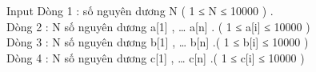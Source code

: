 Input
Dòng 1 : số nguyên dương N ( 1 ≤ N ≤ 10000 ) .   
\\   Dòng 2 : N số nguyên dương a[1] , … a[n] . ( 1 ≤ a[i] ≤ 10000 )   
\\   Dòng 3 : N số nguyên dương b[1] , … b[n] .( 1 ≤ b[i] ≤ 10000 )   
\\   Dòng 4 : N số nguyên dương c[1] , … c[n] .( 1 ≤ c[i] ≤ 10000 )